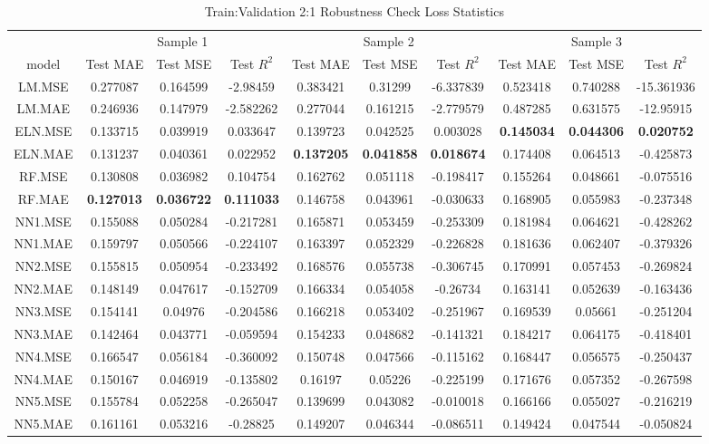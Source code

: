 \begin{table}

\caption{\label{tab:}Train:Validation 2:1 Robustness Check Loss Statistics}
\centering
\fontsize{6}{8}\selectfont
\begin{tabular}[t]{cccccccccc}
\toprule
\multicolumn{1}{c}{ } & \multicolumn{3}{c}{Sample 1} & \multicolumn{3}{c}{Sample 2} & \multicolumn{3}{c}{Sample 3} \\
\cmidrule(l{3pt}r{3pt}){2-4} \cmidrule(l{3pt}r{3pt}){5-7} \cmidrule(l{3pt}r{3pt}){8-10}
model & Test MAE & Test MSE & Test $R^2$ & Test MAE & Test MSE & Test $R^2$ & Test MAE & Test MSE & Test $R^2$\\
\midrule
LM.MSE & 0.277087 & 0.164599 & -2.98459 & 0.383421 & 0.31299 & -6.337839 & 0.523418 & 0.740288 & -15.361936\\
LM.MAE & 0.246936 & 0.147979 & -2.582262 & 0.277044 & 0.161215 & -2.779579 & 0.487285 & 0.631575 & -12.95915\\
ELN.MSE & 0.133715 & 0.039919 & 0.033647 & 0.139723 & 0.042525 & 0.003028 & \textbf{0.145034} & \textbf{0.044306} & \textbf{0.020752}\\
ELN.MAE & 0.131237 & 0.040361 & 0.022952 & \textbf{0.137205} & \textbf{0.041858} & \textbf{0.018674} & 0.174408 & 0.064513 & -0.425873\\
RF.MSE & 0.130808 & 0.036982 & 0.104754 & 0.162762 & 0.051118 & -0.198417 & 0.155264 & 0.048661 & -0.075516\\
RF.MAE & \textbf{0.127013} & \textbf{0.036722} & \textbf{0.111033} & 0.146758 & 0.043961 & -0.030633 & 0.168905 & 0.055983 & -0.237348\\
NN1.MSE & 0.155088 & 0.050284 & -0.217281 & 0.165871 & 0.053459 & -0.253309 & 0.181984 & 0.064621 & -0.428262\\
NN1.MAE & 0.159797 & 0.050566 & -0.224107 & 0.163397 & 0.052329 & -0.226828 & 0.181636 & 0.062407 & -0.379326\\
NN2.MSE & 0.155815 & 0.050954 & -0.233492 & 0.168576 & 0.055738 & -0.306745 & 0.170991 & 0.057453 & -0.269824\\
NN2.MAE & 0.148149 & 0.047617 & -0.152709 & 0.166334 & 0.054058 & -0.26734 & 0.163141 & 0.052639 & -0.163436\\
NN3.MSE & 0.154141 & 0.04976 & -0.204586 & 0.166218 & 0.053402 & -0.251967 & 0.169539 & 0.05661 & -0.251204\\
NN3.MAE & 0.142464 & 0.043771 & -0.059594 & 0.154233 & 0.048682 & -0.141321 & 0.184217 & 0.064175 & -0.418401\\
NN4.MSE & 0.166547 & 0.056184 & -0.360092 & 0.150748 & 0.047566 & -0.115162 & 0.168447 & 0.056575 & -0.250437\\
NN4.MAE & 0.150167 & 0.046919 & -0.135802 & 0.16197 & 0.05226 & -0.225199 & 0.171676 & 0.057352 & -0.267598\\
NN5.MSE & 0.155784 & 0.052258 & -0.265047 & 0.139699 & 0.043082 & -0.010018 & 0.166166 & 0.055027 & -0.216219\\
NN5.MAE & 0.161161 & 0.053216 & -0.28825 & 0.149207 & 0.046344 & -0.086511 & 0.149424 & 0.047544 & -0.050824\\
\bottomrule
\end{tabular}
\end{table}